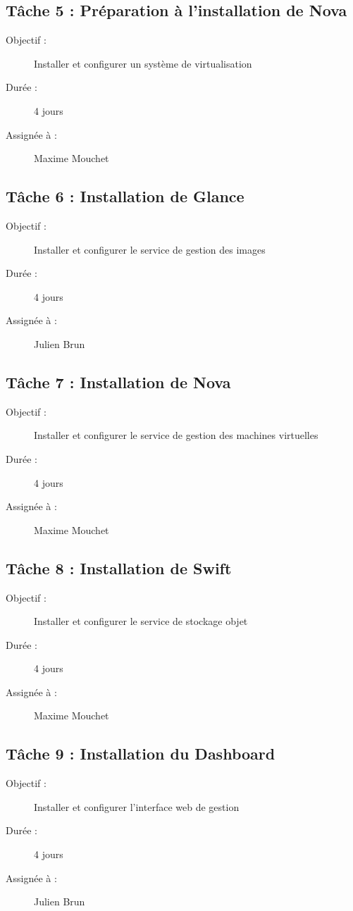 \subsection*{Tâche 5 : Préparation à l'installation de Nova}
\begin{description}
\item[Objectif :] Installer et configurer un système de virtualisation
\item[Durée :]  4 jours
\item[Assignée à :] Maxime Mouchet
\end{description}

\subsection*{Tâche 6 : Installation de Glance}
\begin{description}
\item[Objectif :] Installer et configurer le service de gestion des images
\item[Durée :]  4 jours
\item[Assignée à :] Julien Brun
\end{description}

\subsection*{Tâche 7 : Installation de Nova}
\begin{description}
\item[Objectif :] Installer et configurer le service de gestion des machines virtuelles
\item[Durée :]  4 jours
\item[Assignée à :] Maxime Mouchet
\end{description}

\subsection*{Tâche 8 : Installation de Swift}
\begin{description}
\item[Objectif :] Installer et configurer le service de stockage objet
\item[Durée :]  4 jours
\item[Assignée à :] Maxime Mouchet
\end{description}

\subsection*{Tâche 9 : Installation du Dashboard}
\begin{description}
\item[Objectif :] Installer et configurer l'interface web de gestion
\item[Durée :]  4 jours
\item[Assignée à :] Julien Brun
\end{description}

